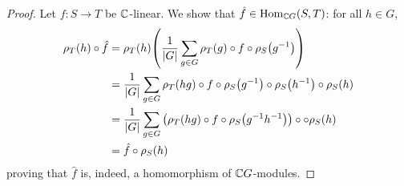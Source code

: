 \begin{proof}
    Let $f : S \to T$ be $\mathbb{C}$-linear. We show that $\hat{f} \in \operatorname{Hom}_{\mathbb{C} G}(S, T)$: for all $h \in G$,
    \begin{align*}
        \rho_T(h) \circ \hat{f} &= \rho_T(h)\!\left( \frac{1}{\left\lvert G \right\rvert} \sum_{g \in G} \rho_T(g) \circ f \circ \rho_S\!\left( g^{-1} \right) \right) \\
        &= \frac{1}{\left\lvert G \right\rvert} \sum_{g \in G} \rho_T(hg) \circ f \circ \rho_S\!\left( g^{-1} \right) \circ \rho_S\!\left( h^{-1} \right) \circ \rho_S(h) \\
        &= \frac{1}{\left\lvert G \right\rvert} \sum_{g \in G} \left( \rho_T(hg) \circ f \circ \rho_S\!\left( g^{-1} h^{-1} \right) \right) \circ \circ \rho_S(h) \\
        &= \hat{f} \circ \rho_S(h)
    \end{align*}
    proving that $\hat{f}$ is, indeed, a homomorphism of $\mathbb{C} G$-modules.


\end{proof}

